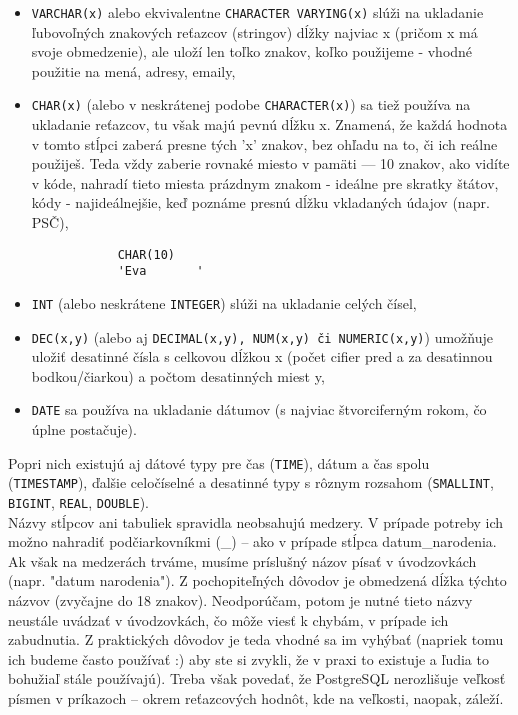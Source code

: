 \documentclass[a4paper,11pt]{report}
\newcommand{\sqlkw}[1]{\texttt{\textcolor{sqlkeyword}{#1}}}
\begin{document}
	\begin{itemize}
		\item \sqlkw{VARCHAR(x)} alebo ekvivalentne \sqlkw{CHARACTER VARYING(x)} slúži na ukladanie ľubovoľných znakových reťazcov (stringov) dĺžky najviac x (pričom x má svoje obmedzenie), ale uloží len toľko znakov, koľko použijeme - vhodné použitie na mená, adresy, emaily,
		\item \sqlkw{CHAR(x)} (alebo v neskrátenej podobe \sqlkw{CHARACTER(x)}) sa tiež používa na ukladanie reťazcov, tu však majú pevnú dĺžku x. Znamená, že každá hodnota v tomto stĺpci zaberá presne tých 'x' znakov, bez ohľadu na to, či ich reálne použiješ. Teda vždy zaberie rovnaké miesto v pamäti — 10 znakov, ako vidíte v kóde, nahradí tieto miesta prázdnym znakom - ideálne pre skratky štátov, kódy - najideálnejšie, keď poznáme presnú dĺžku vkladaných údajov (napr. PSČ),
		\begin{verbatim}
			CHAR(10)
			'Eva       '
		\end{verbatim}
		\item \sqlkw{INT} (alebo neskrátene \sqlkw{INTEGER}) slúži na ukladanie celých čísel,
		\item \sqlkw{DEC(x,y)} (alebo aj \sqlkw{DECIMAL(x,y), NUM(x,y) či NUMERIC(x,y)}) umožňuje uložiť desatinné čísla s celkovou dĺžkou x (počet cifier pred a za desatinnou bodkou/čiarkou) a počtom desatinných miest y,
		\item \sqlkw{DATE} sa používa na ukladanie dátumov (s najviac štvorciferným rokom, čo úplne postačuje).
	\end{itemize} 
	
	Popri nich existujú aj dátové typy pre čas (\sqlkw{TIME}), dátum a čas spolu (\sqlkw{TIMESTAMP}), ďalšie celočíselné a desatinné typy s rôznym rozsahom (\sqlkw{SMALLINT}, \sqlkw{BIGINT}, \sqlkw{REAL}, \sqlkw{DOUBLE}). \\
	
	Názvy stĺpcov ani tabuliek spravidla neobsahujú medzery. V prípade potreby ich možno nahradiť podčiarkovníkmi (\_) – ako v prípade stĺpca datum\_narodenia. Ak však na medzerách trváme, musíme príslušný názov písať v úvodzovkách (napr. "datum narodenia").  Z pochopiteľných dôvodov je obmedzená dĺžka týchto názvov (zvyčajne do 18 znakov). Neodporúčam, potom je nutné tieto názvy neustále uvádzať v úvodzovkách, čo môže viesť k chybám, v prípade ich zabudnutia. Z praktických dôvodov je teda vhodné sa im vyhýbať (napriek tomu ich budeme často používať :) aby ste si zvykli, že v praxi to existuje a ľudia to bohužiaľ stále používajú). Treba však povedať, že PostgreSQL nerozlišuje veľkosť písmen v príkazoch – okrem reťazcových hodnôt, kde na veľkosti, naopak, záleží. \\
	
\end{document}
